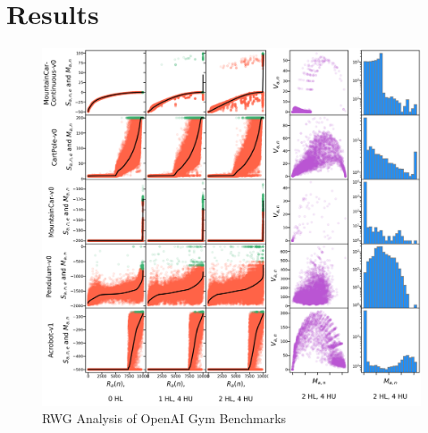 \documentclass[12pt]{article}
\begin{document}
\section{Results}

\begin{figure}
	\centering
	\includegraphics[width=\textwidth]{plots/oller_plot.png}
	\caption{RWG Analysis of OpenAI Gym Benchmarks}
	\label{fig:oller}
\end{figure}
\end{document}
